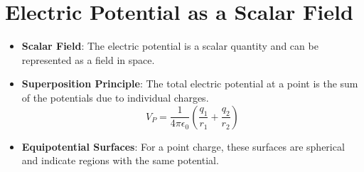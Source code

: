 \documentclass{article}
\begin{document}
\section*{Electric Potential as a Scalar Field}
\begin{itemize}
    \item \textbf{Scalar Field}: The electric potential is a scalar quantity and can be represented as a field in space.
    \item \textbf{Superposition Principle}: The total electric potential at a point is the sum of the potentials due to individual charges.
    \[
    V_P = \frac{1}{4 \pi \epsilon_0} \left( \frac{q_1}{r_1} + \frac{q_2}{r_2} \right)
    \]
    \item \textbf{Equipotential Surfaces}: For a point charge, these surfaces are spherical and indicate regions with the same potential.
\end{itemize}
\end{document}
